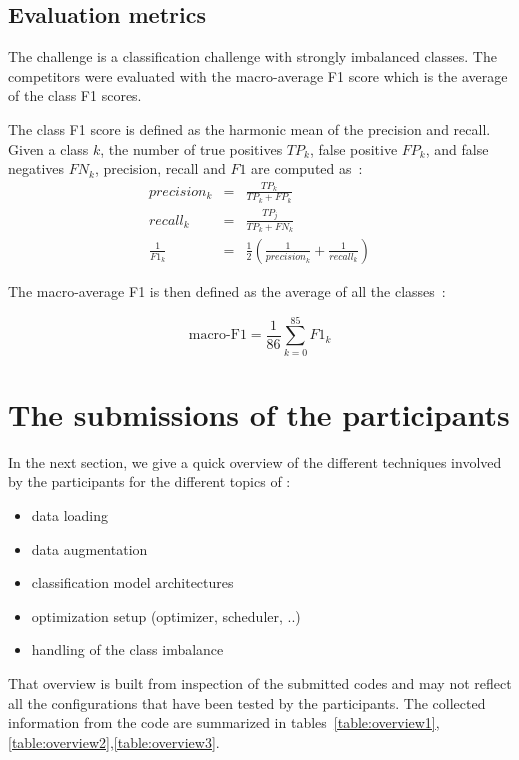 \documentclass{article}
\begin{document}

\subsection{Evaluation metrics}

The challenge is a classification challenge with strongly imbalanced classes. The competitors were evaluated with the macro-average F1 score which is the average of the class F1 scores.

The class F1 score is defined as the harmonic mean of the precision and recall. Given a class $k$, the number of true positives $TP_k$, false positive $FP_k$, and false negatives $FN_k$, precision, recall and $F1$ are computed as~:
\begin{eqnarray*}
	precision_k &=& \frac{TP_k}{TP_k + FP_k}\\
	recall_k &=& \frac{TP_j}{TP_k + FN_k}\\
	\frac{1}{F1_k} &=& \frac{1}{2}(\frac{1}{precision_k} + \frac{1}{recall_k})
\end{eqnarray*}

The macro-average F1 is then defined as the average of all the classes~:

\begin{equation}
	\mbox{macro-F1} = \frac{1}{86}\sum_{k=0}^{85} F1_k
\end{equation}

\section{The submissions of the participants}

In the next section, we give a quick overview of the different techniques involved by the participants for the different topics of : 

\begin{itemize}
	\item data loading 
	\item data augmentation
	\item classification model architectures
	\item optimization setup (optimizer, scheduler, ..)
	\item handling of the class imbalance
\end{itemize}

That overview is built from inspection of the submitted codes and may not reflect all the configurations that have been tested by the participants. The collected information from the code are summarized in tables~\ref{table:overview1},\ref{table:overview2},\ref{table:overview3}.
\end{document}
